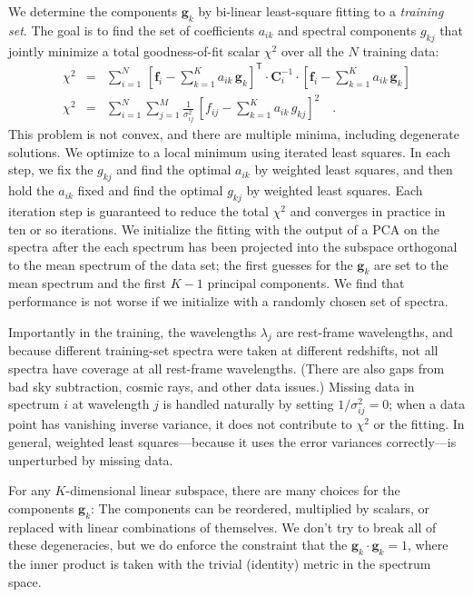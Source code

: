 \documentclass[preprint]{aastex}
\newcommand{\mmatrix}[1]{\boldsymbol{#1}}
\newcommand{\inverse}[1]{{#1}^{-1}}
\newcommand{\transpose}[1]{{#1}^{\mathsf{T}}}
\newcommand{\covar}{\mmatrix{C}}
\newcommand{\fvec}{\mmatrix{f}}
\newcommand{\gvec}{\mmatrix{g}}
\newcommand{\invvar}{\inverse{\covar}}
\begin{document}
We determine the components $\gvec_k$ by bi-linear least-square
fitting to a \emph{training set}.  The goal is to find the set of
coefficients $a_{ik}$ and spectral components $g_{kj}$ that jointly
minimize a total goodness-of-fit scalar $\chi^2$ over all the $N$
training data:
\begin{eqnarray}\displaystyle
\chi^2 &=& \sum_{i=1}^N 
 \,\transpose{\left[\fvec_i - \sum_{k=1}^K a_{ik}\,\gvec_k\right]}
 \cdot\invvar_i\cdot\left[\fvec_i - \sum_{k=1}^K a_{ik}\,\gvec_k\right]
 \nonumber\\
\chi^2 &=& \sum_{i=1}^N \sum_{j=1}^M \frac{1}{\sigma^2_{ij}}
 \,\left[f_{ij} - \sum_{k=1}^K a_{ik}\,g_{kj}\right]^2
\quad .
\end{eqnarray}
This problem is not convex, and there are multiple minima, including
degenerate solutions.  We optimize to a local minimum using iterated
least squares.  In each step, we fix the $g_{kj}$ and find the optimal
$a_{ik}$ by weighted least squares, and then hold the $a_{ik}$ fixed
and find the optimal $g_{kj}$ by weighted least squares.  Each
iteration step is guaranteed to reduce the total $\chi^2$ and
converges in practice in ten or so iterations.  We initialize the
fitting with the output of a PCA on the spectra after the each
spectrum has been projected into the subspace orthogonal to the mean
spectrum of the data set; the first guesses for the $\gvec_k$ are set
to the mean spectrum and the first $K-1$ principal components.  We
find that performance is not worse if we initialize with a randomly
chosen set of spectra.

Importantly in the training, the wavelengths $\lambda_j$ are
rest-frame wavelengths, and because different training-set spectra
were taken at different redshifts, not all spectra have coverage at
all rest-frame wavelengths.  (There are also gaps from bad sky
subtraction, cosmic rays, and other data issues.)  Missing data in
spectrum $i$ at wavelength $j$ is handled naturally by setting
$1/\sigma^2_{ij}=0$; when a data point has vanishing inverse
variance, it does not contribute to $\chi^2$ or the fitting.  In
general, weighted least squares---because it uses the error variances
correctly---is unperturbed by missing data.

For any $K$-dimensional linear subspace, there are many choices for
the components $\gvec_k$: The components can be reordered, multiplied
by scalars, or replaced with linear combinations of themselves.  We
don't try to break all of these degeneracies, but we do enforce the
constraint that the $\gvec_k\cdot\gvec_k=1$, where the inner product
is taken with the trivial (identity) metric in the spectrum space.
\end{document}
